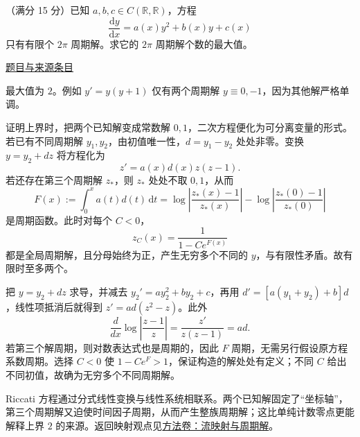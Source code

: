 \documentclass[UTF8,12pt,a4paper,fontset=fandol]{ctexart}
\begin{document}
\begin{example}\label{ex:fin10-lo:9}\label{pr:fin10-lo:9}

（满分 15 分）已知 $a,b,c\in C(\mathbb{R},\mathbb{R})$，方程
\[
\frac{\mathrm{d}y}{\mathrm{d}x}=a(x)y^{2}+b(x)y+c(x)
\]
只有有限个 $2\pi$ 周期解。求它的 $2\pi$ 周期解个数的最大值。

\par\href{https://github.com/lzxcr/cmc-mathematics/blob/64916fa1fdbc3e444a652eca204d5669058ee321/src/problems/finals/10/10.md}{题目与来源条目}

\end{example}

\begin{solve}\label{ans:fin10-lo:9}

最大值为 $2$。例如 $y'=y(y+1)$ 仅有两个周期解 $y\equiv0,-1$，因为其他解严格单调。

证明上界时，把两个已知解变成常数解 $0,1$，二次方程便化为可分离变量的形式。若已有不同周期解 $y_1,y_2$，由初值唯一性，$d=y_1-y_2$ 处处非零。变换 $y=y_2+dz$ 将方程化为
\[
z'=a(x)d(x)z(z-1).
\]
若还存在第三个周期解 $z_*$，则 $z_*$ 处处不取 $0,1$，从而
\[
F(x):=\int_0^xa(t)d(t)\,\mathrm dt
=\log\left|\frac{z_*(x)-1}{z_*(x)}\right|-\log\left|\frac{z_*(0)-1}{z_*(0)}\right|
\]
是周期函数。此时对每个 $C<0$，
\[
z_C(x)=\frac1{1-Ce^{F(x)}}
\]
都是全局周期解，且分母始终为正，产生无穷多个不同的 $y$，与有限性矛盾。故有限时至多两个。

把 $y=y_2+dz$ 求导，并减去 $y_2'=ay_2^2+by_2+c$，再用 $d'=[a(y_1+y_2)+b]d$，线性项抵消后就得到 $z'=ad(z^2-z)$。此外
\[
\frac{d}{dx}\log\left|\frac{z-1}{z}\right|=\frac{z'}{z(z-1)}=ad.
\]
若第三个解周期，则对数表达式也是周期的，因此 $F$ 周期，无需另行假设原方程系数周期。选择 $C<0$ 使 $1-Ce^F>1$，保证构造的解处处有定义；不同 $C$ 给出不同初值，故确为无穷多个不同周期解。

\end{solve}

\begin{remark}[方法与条件]Riccati 方程通过分式线性变换与线性系统相联系。两个已知解固定了“坐标轴”，第三个周期解又迫使时间因子周期，从而产生整族周期解；这比单纯计数零点更能解释上界 $2$ 的来源。返回映射观点见\hyperref[app:dynamics-flow]{方法卷：流映射与周期解}。\end{remark}
\end{document}
